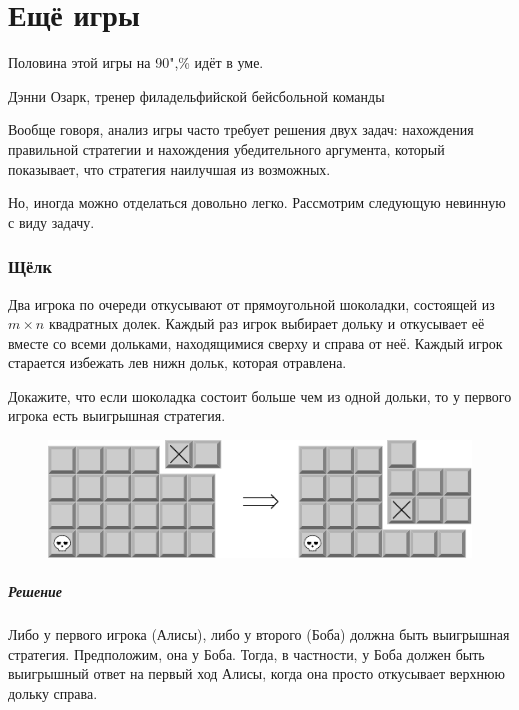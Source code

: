 \documentclass[twoside]{book}
\makeatletter
\newcommand{\rindex}[2][\imki@jobname]{%
  \index[#1]{\detokenize{#2}}%
}
\makeatother
\begin{document}

\chapter{Ещё игры}

\setlength{\epigraphwidth}{.5\textwidth}
\epigraph{Половина этой игры на 90",\% идёт в уме.\vspace{1ex}}{Дэнни Озарк, тренер филадельфийской бейсбольной команды}

Вообще говоря, анализ игры часто требует решения двух задач: нахождения правильной стратегии и нахождения убедительного аргумента, который показывает, что стратегия наилучшая из возможных.

Но, иногда можно отделаться довольно легко.
Рассмотрим следующую невинную с виду задачу.

\subsection*{Щёлк}%
\rindex{Щёлк}

Два игрока по очереди откусывают от прямоугольной шоколадки, состоящей из $m \times n$ квадратных долек.
Каждый раз игрок выбирает дольку и откусывает её вместе со всеми дольками, находящимися сверху и справа от неё.
Каждый игрок старается избежать лев нижн дольк, которая отравлена.

Докажите, что если шоколадка состоит больше чем из одной дольки, то у первого игрока есть выигрышная стратегия.

\begin{figure}[h]
\centering
\includegraphics{mp/wink-23}
\end{figure}

\paragraph{Решение} Либо у первого игрока (Алисы), либо у второго (Боба) должна быть выигрышная стратегия.
Предположим,  она  у Боба.
Тогда, в частности, у Боба должен быть выигрышный ответ на первый ход Алисы, когда она просто откусывает верхнюю дольку справа.
\end{document}

